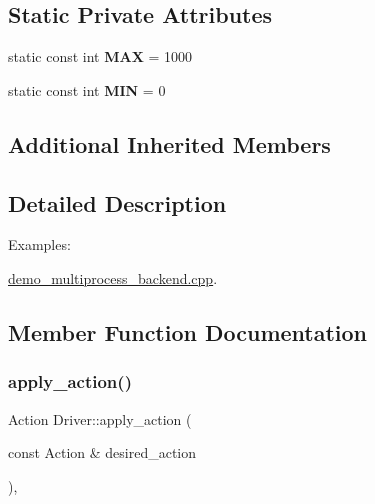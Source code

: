 \subsection*{Static Private Attributes}
\begin{DoxyCompactItemize}
\item 
\mbox{\label{classDriver_a2f75d16f4af650ca9cf1cdd8b653cc18}} 
static const int {\bfseries M\+AX} = 1000
\item 
\mbox{\label{classDriver_a09b06e92e4ea9df756e3b6e038fa25f6}} 
static const int {\bfseries M\+IN} = 0
\end{DoxyCompactItemize}
\subsection*{Additional Inherited Members}


\subsection{Detailed Description}
\begin{Desc}
\item[Examples\+: ]\par
\hyperlink{demo_multiprocess_backend_8cpp-example}{demo\+\_\+multiprocess\+\_\+backend.\+cpp}.\end{Desc}


\subsection{Member Function Documentation}
\mbox{\label{classDriver_a0f8d51bef151ccc38a0cb7b226048e28}} 
\subsubsection{\texorpdfstring{apply\+\_\+action()}{apply\_action()}}
{\footnotesize\ttfamily Action Driver\+::apply\+\_\+action (\begin{DoxyParamCaption}\item[{const Action \&}]{desired\+\_\+action }\end{DoxyParamCaption})\hspace{0.3cm}{\ttfamily [inline]}, {\ttfamily [virtual]}}



